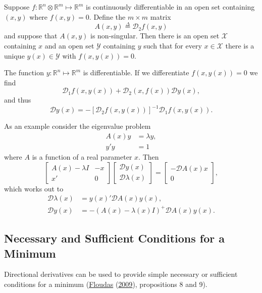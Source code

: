 \documentclass[
  12pt,
]{book}
\begin{document}
Suppose \(f:\mathbb{R}^n\otimes\mathbb{R}^m\mapsto\mathbb{R}^m\) is continuously differentiable in an open set containing \((x,y)\) where \(f(x,y)=0.\) Define the \(m\times m\) matrix
\[
A(x,y)\mathop{=}\limits^{\Delta}\mathcal{D}_2f(x,y)
\]
and suppose that \(A(x,y)\) is non-singular. Then there is an open set \(\mathcal{X}\) containing \(x\) and an open
set \(\mathcal{Y}\) containing \(y\) such that
for every \(x\in\mathcal{X}\) there is a unique \(y(x)\in\mathcal{Y}\) with \(f(x,y(x))=0.\)

The function \(y:\mathbb{R}^n\mapsto\mathbb{R}^m\) is
differentiable. If we differentiate \(f(x,y(x))=0\) we
find
\[
\mathcal{D}_1f(x,y(x))+\mathcal{D}_2(x,f(x))\mathcal{D}y(x),
\]
and thus
\[
\mathcal{D}y(x)=-[\mathcal{D}_2f(x,y(x))]^{-1}\mathcal{D}_1f(x,y(x)).
\]

As an example consider the eigenvalue problem
\begin{align*}
A(x)y&=\lambda y,\\
y'y&=1
\end{align*}
where \(A\) is a function of a real parameter \(x\). Then
\[
\begin{bmatrix}
A(x)-\lambda I&-x\\
x'&0
\end{bmatrix}
\begin{bmatrix}
\mathcal{D}y(x)\\
\mathcal{D}\lambda(x)
\end{bmatrix}
=
\begin{bmatrix}
-\mathcal{D}A(x)x\\
0
\end{bmatrix},
\]
which works out to
\begin{align*}
\mathcal{D}\lambda(x)&=y(x)'\mathcal{D}A(x)y(x),\\
\mathcal{D}y(x)&=-(A(x)-\lambda(x)I)^+\mathcal{D}A(x)y(x).
\end{align*}

\hypertarget{necessary-and-sufficient-conditions-for-a-minimum}{%
\subsection{Necessary and Sufficient Conditions for a Minimum}\label{necessary-and-sufficient-conditions-for-a-minimum}}

Directional derivatives can be used to provide simple necessary or sufficient conditions for a minimum (\protect\hyperlink{ref-demyanov_09}{Floudas} (\protect\hyperlink{ref-demyanov_09}{2009}), propositions 8 and 9).
\end{document}
